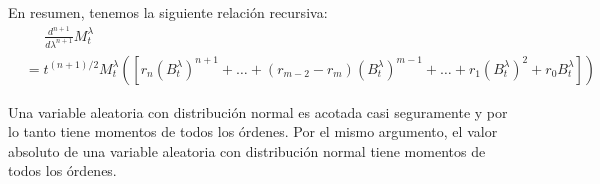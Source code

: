 En resumen, tenemos la siguiente relación recursiva:
\tiny
\begin{align}\label{problema6_4:equivalencia_recursiva}
    &\;\;\;\;\;\frac{d^{n+1}}{d\lambda^{n+1}} M_t^\lambda     \\
    &= t^{(n+1)/2}  M_t^\lambda \left( \left[ r_n (B_t^\lambda)^{n+1}  + \dots + (r_{m-2} - r_{m})(B_t^\lambda)^{m-1} + \dots + r_1 (B_t^\lambda)^2 + r_0 B_t^\lambda \right]\right) 
\end{align}\pn
\normalsize

Una variable aleatoria con distribución normal es acotada casi seguramente y 
por lo tanto tiene momentos de todos los órdenes. Por el mismo argumento, el valor 
absoluto de una variable aleatoria con distribución normal tiene momentos de todos los
órdenes.

